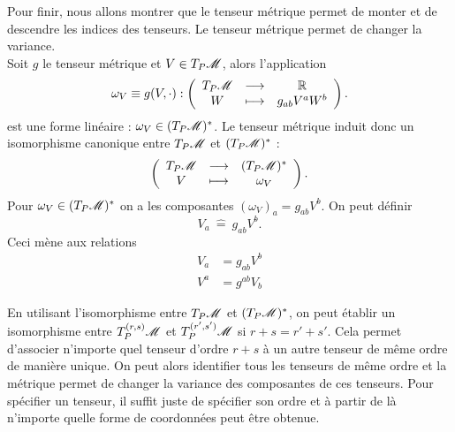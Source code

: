 \documentclass[a4paper,11pt]{report}
\begin{document}
                Pour finir, nous allons montrer que le tenseur métrique permet de monter et de descendre les indices des tenseurs. Le tenseur métrique permet de changer la variance.\\
                
                Soit $g$ le tenseur métrique et $V\in T_P\mathscr{M}$, alors l'application
                \begin{equation}
                    \omega_V\equiv g(V,\cdot):\left(
                \begin{array}{ccc}
                    T_P\mathscr{M} & \longrightarrow & \mathbb{R} \\
                    W & \longmapsto & g_{ab}V^a W^b
                \end{array}
                \right).
                \end{equation}
                est une forme linéaire : $\omega_V\in(T_P\mathscr{M})^*$. Le tenseur métrique induit donc un isomorphisme canonique entre $T_P\mathscr{M}$ et $(T_P\mathscr{M})^*$ :
                \begin{equation}
                    \left(
                \begin{array}{ccc}
                    T_P\mathscr{M} & \longrightarrow & (T_P\mathscr{M})^* \\
                    V & \longmapsto & \omega_V
                \end{array}
                \right).
                \end{equation}
                Pour $\omega_V\in(T_P\mathscr{M})^*$ on a les composantes $(\omega_V)_a = g_{ab}V^b$. On peut définir 
                \begin{equation}
                    V_a ~\hat{=}~ g_{ab}V^b.
                \end{equation}
                Ceci mène aux relations 
                \begin{align}
                    V_a &= g_{ab}V^b \\
                    V^a &= g^{ab}V_b
                \end{align}
                
                En utilisant l'isomorphisme entre $T_P\mathscr{M}$ et $(T_P\mathscr{M})^*$, on peut établir un isomorphisme entre $T_P^{(r,s)}\mathscr{M}$ et $T_P^{(r',s')}\mathscr{M}$ si $r+s=r'+s'$. Cela permet d'associer n'importe quel tenseur d'ordre $r+s$ à un autre tenseur de même ordre de manière unique. On peut alors identifier tous les tenseurs de même ordre et la métrique permet de changer la variance des composantes de ces tenseurs. Pour spécifier un tenseur, il suffit juste de spécifier son ordre et à partir de là n'importe quelle forme de coordonnées peut être obtenue.
                
\end{document}
